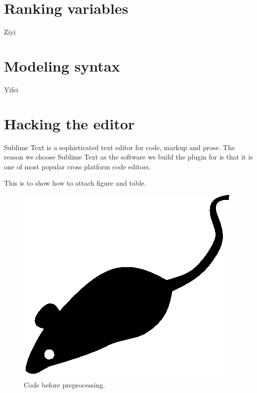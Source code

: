 \documentclass[prodmode,acmtecs]{acmsmall} %
\begin{document}
\section{Ranking variables}
Ziyi
\section{Modeling syntax}
Yifei
\section{Hacking the editor}

Sublime Text is a sophisticated text editor for code, markup and prose\cite{skinner2016sublime}. The reason we choose Sublime Text as the software we build the plugin for is that it is one of most popular cross platform code editors. 



This is to show how to attach figure and table.

\begin{figure}
\centerline{\includegraphics{acmsmall-mouse}}
\caption{Code before preprocessing.}
\label{fig:one}
\end{figure}
\end{document}
